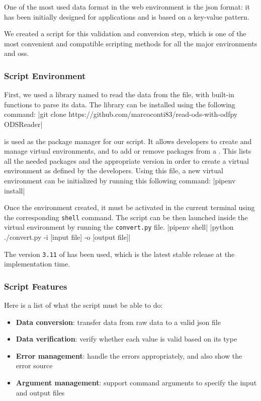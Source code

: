 One of the most used data format in the web environment is the \gls{json} format: it has been initially designed for  applications and is based on a key-value pattern. 

We created a  script for this validation and conversion step, which is one of the most convenient and compatible scripting methods for all the major environments and \glspl{os}.

\subsubsection{Script Environment}
\label{subsubsec:app_implementation_data_environment}

First, we used a library named  to read the data from the  file, with built-in functions to parse its data. The library can be installed using the following command:
|git clone https://github.com/marcoconti83/read-ods-with-odfpy ODSReader|

 is used as the package manager for our script. It allows developers to create and manage  virtual environments, and to add or remove packages from a . This  lists all the needed packages and the appropriate  version in order to create a virtual environment as defined by the developers. Using this file, a new virtual environment can be initialized by running this following command:
|pipenv install|

Once the environment created, it must be activated in the current terminal using the corresponding \texttt{shell} command. The script can be then launched inside the virtual environment by running the \texttt{convert.py} file.
|pipenv shell|
|python ./convert.py -i [input file] -o [output file]|

The version \texttt{3.11} of  has been used, which is the latest stable release at the implementation time.

\subsubsection{Script Features}
\label{subsubsec:app_implementation_data_features}

Here is a list of what the script must be able to do:
\begin{itemize}
	\item \textbf{Data conversion}: transfer data from raw data to a valid \gls{json} file
	\item \textbf{Data verification}: verify whether each value is valid based on its type
	\item \textbf{Error management}: handle the errors appropriately, and also show the error source
	\item \textbf{Argument management}: support command arguments to specify the input and output files
\end{itemize}

